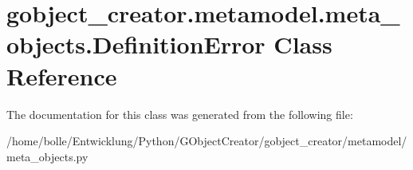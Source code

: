 \hypertarget{classgobject__creator_1_1metamodel_1_1meta__objects_1_1DefinitionError}{
\section{gobject\_\-creator.metamodel.meta\_\-objects.DefinitionError Class Reference}
\label{classgobject__creator_1_1metamodel_1_1meta__objects_1_1DefinitionError}
}


The documentation for this class was generated from the following file:\begin{DoxyCompactItemize}
\item 
/home/bolle/Entwicklung/Python/GObjectCreator/gobject\_\-creator/metamodel/meta\_\-objects.py\end{DoxyCompactItemize}
